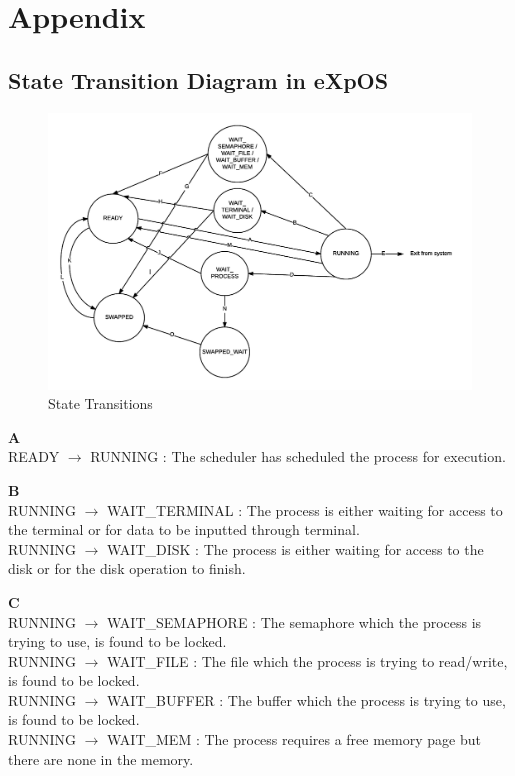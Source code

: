 \chapter{Appendix}
\label{app2}

\section{State Transition Diagram in eXpOS}

\begin{figure}[ht]
\centering
\includegraphics[scale=0.70]{figures/state.png}
\caption{\footnotesize State Transitions}
\label{fig_1}
\end{figure}

\textbf{A}\\
READY $\rightarrow$ RUNNING : The scheduler has scheduled the process for execution.

\textbf{B}\\
RUNNING  $\rightarrow$ WAIT\_TERMINAL : The process is either waiting for access to the terminal or for data to be inputted through terminal.\\
RUNNING  $\rightarrow$ WAIT\_DISK :  The process is either waiting for access to the disk or for the disk operation to finish.

\textbf{C}\\
RUNNING $\rightarrow$ WAIT\_SEMAPHORE : The semaphore which the process is trying to use, is found to be locked.\\
RUNNING $\rightarrow$ WAIT\_FILE : The file which the process is trying to read/write, is found to be locked.\\
RUNNING $\rightarrow$ WAIT\_BUFFER : The buffer which the process is trying to use, is found to be locked.\\
RUNNING $\rightarrow$ WAIT\_MEM : The process requires a free memory page but there are none in the memory.

